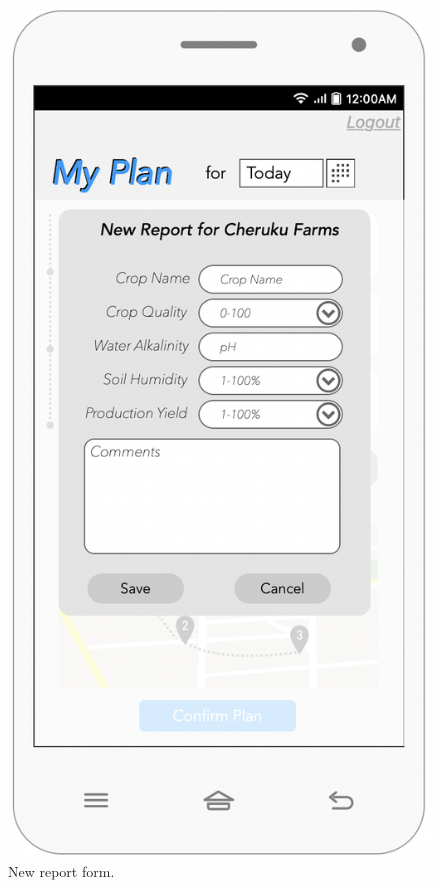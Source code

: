 \begin{multicols}{2}
\begin{figure}[H]
\centering
\includegraphics[scale=0.5]{../images_diagrams/mock_ups/dd/Plan06_NewReport.png}
\caption{\label{fig:mockplan_report}New report form.}
\end{figure}
\end{multicols}

